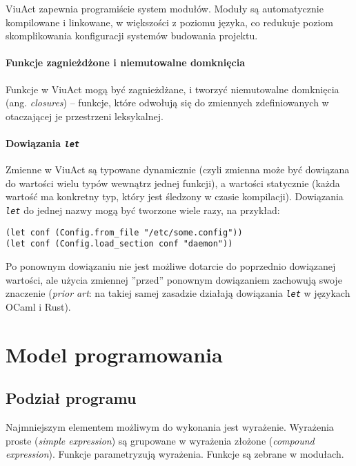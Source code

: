 ViuAct zapewnia programiście system modułów. Moduły są automatycznie kompilowane i linkowane, w większości z
poziomu języka, co redukuje poziom skomplikowania konfiguracji systemów budowania projektu.

\paragraph*{Funkcje zagnieżdżone i niemutowalne domknięcia}

Funkcje w ViuAct mogą być zagnieżdżane, i tworzyć niemutowalne domknięcia (ang. \emph{closures}) -- funkcje,
które odwołują się do zmiennych zdefiniowanych w otaczającej je przestrzeni leksykalnej.

\paragraph*{Dowiązania \emph{\texttt{let}}}

Zmienne w ViuAct są typowane dynamicznie (czyli zmienna może być dowiązana do wartości wielu typów wewnątrz
jednej funkcji), a wartości statycznie (każda wartość ma konkretny typ, który jest śledzony w czasie
kompilacji). Dowiązania \emph{\texttt{let}} do jednej nazwy mogą być tworzone wiele razy, na przykład:

\begin{lstlisting}
(let conf (Config.from_file "/etc/some.config"))
(let conf (Config.load_section conf "daemon"))
\end{lstlisting}

Po ponownym dowiązaniu nie jest możliwe dotarcie do poprzednio dowiązanej wartości, ale użycia zmiennej
''przed'' ponownym dowiązaniem zachowują swoje znaczenie (\emph{prior art}: na takiej samej zasadzie działają
dowiązania \emph{\texttt{let}} w językach OCaml i Rust).

\section{Model programowania}
\label{specyfikacja_jezyka_viuact_model_programowania}

\subsection{Podział programu}

Najmniejszym elementem możliwym do wykonania jest wyrażenie.
Wyrażenia proste (\emph{simple expression}) są grupowane w wyrażenia złożone (\emph{compound expression}).
Funkcje parametryzują wyrażenia.
Funkcje są zebrane w modułach.

